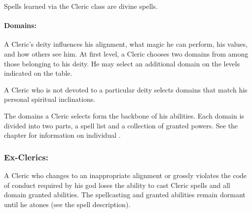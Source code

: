 Spells learned via the Cleric class are divine spells.
\paragraph{Domains:}
A Cleric's deity influences his alignment, what magic he can perform, his values, and how others see him. 
At first level, a Cleric chooses two domains from among those belonging to his deity.
He may select an additional domain on the levels indicated on the  table.

A Cleric who is not devoted to a particular deity selects domains that match his personal spiritual inclinations.

The domains a Cleric selects form the backbone of his abilities.
Each domain is divided into two parts, a spell list and a collection of granted powers.
See the  chapter for information on individual .
\subsubsection{Ex-Clerics:}
A Cleric who changes to an inappropriate alignment or grossly violates the code of conduct required by his god loses the ability to cast Cleric spells and all domain granted abilities.
The spellcasting and granted abilities remain dormant until he atones (see the  spell description).
